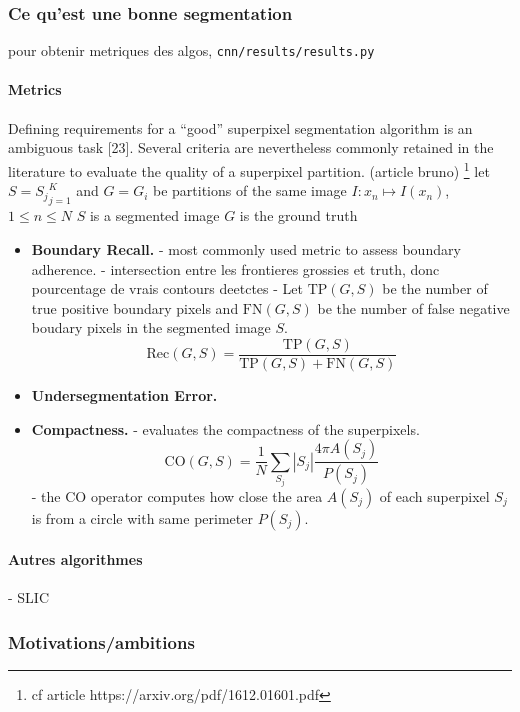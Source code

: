 \documentclass{article}
\begin{document}
        \subsubsection{Ce qu'est une bonne \spp segmentation}
            pour obtenir metriques des algos, \texttt{cnn/results/results.py}
            \paragraph{Metrics} Defining requirements for a “good” superpixel segmentation algorithm is an ambiguous task [23]. Several criteria are nevertheless commonly retained in the literature to evaluate the quality of a superpixel partition. (article bruno)
            \footnote{cf article https://arxiv.org/pdf/1612.01601.pdf}
            let $S = {S_j}^K_{j=1}$ and $G = {G_i}$ be partitions of the same image $I : x_n \mapsto I(x_n)$, $1 \leq n \leq N$
            $S$ is a segmented image
            $G$ is the ground truth
            \begin{itemize}
                \item \textbf{Boundary Recall.}
                - most commonly used metric to assess boundary adherence.
                - intersection entre les frontieres grossies et truth, donc pourcentage de vrais contours deetctes
                - Let $\text{TP}(G,S)$ be the number of true positive boundary pixels and $\text{FN}(G,S)$ be the number of false negative boudary pixels in the segmented image $S$.
                $$\mathrm{Rec}(G,S)=\frac{\mathrm{TP}(G,S)}{\mathrm{TP}(G,S)+\mathrm{FN}(G,S)}$$
                \item \textbf{Undersegmentation Error.}
                \item \textbf{Compactness.}
                - evaluates the compactness of the superpixels.
                $$
                \mathrm{CO}(G, S)=\frac{1}{N} \sum_{S_{j}}|S_{j}| \frac{4 \pi A\left(S_{j}\right)}{P\left(S_{j}\right)}
                $$
                - the $\mathrm{CO}$ operator computes how close the area $A(S_j)$ of each superpixel $S_j$ is from a circle with same perimeter $P(S_j)$.
            \end{itemize}

            \paragraph{Autres algorithmes}
                - SLIC

        \subsubsection{Motivations/ambitions}
\end{document}
